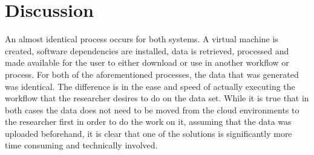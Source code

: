 \begin{table}[ht!]
\renewcommand\footnoterule{}
\caption[Step Differences between Nikeza and Amazon AWS]{The differences between steps needed to complete the work task using OpenStack with Nikeza and Amazon AWS.}
\label{tab:comparison_overview}
\end{table}

\section{Discussion}

An almost identical process occurs for both systems. A virtual machine is created, software dependencies are installed, data is retrieved, processed and made available for the user to either download or use in another workflow or process. For both of the aforementioned processes, the data that was generated was identical. The difference is in the ease and speed of actually executing the workflow that the researcher desires to do on the data set. While it is true that in both cases the data does not need to be moved from the cloud environments to the researcher first in order to do the work on it, assuming that the data was uploaded beforehand, it is clear that one of the solutions is significantly more time consuming and technically involved.

